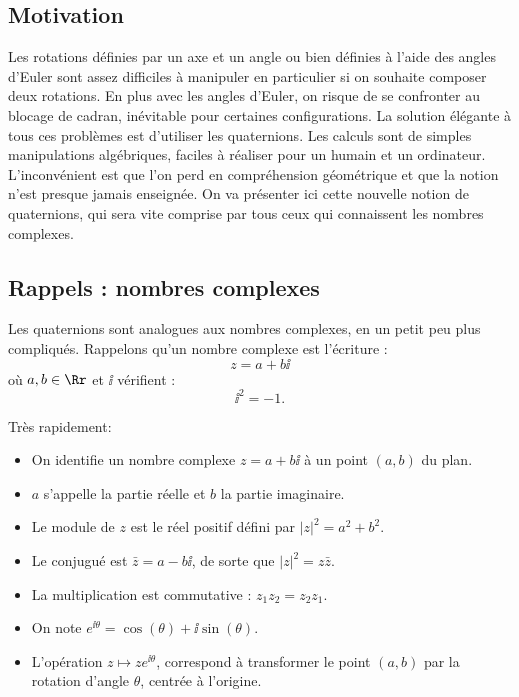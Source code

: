 \documentclass[11pt,class=report,crop=false]{standalone}
\begin{document}

\subsection{Motivation}

Les rotations définies par un axe et un angle ou bien définies à l'aide des angles d'Euler sont assez difficiles à manipuler en particulier si on souhaite composer deux rotations. En plus avec les angles d'Euler, on risque de se confronter au \og{}blocage de cadran\fg{}, inévitable pour certaines configurations.
La solution élégante à tous ces problèmes est d'utiliser les quaternions. Les calculs sont de simples manipulations algébriques, faciles à réaliser pour un humain et un ordinateur.
L'inconvénient est que l'on perd en compréhension géométrique et que la notion n'est presque jamais enseignée. On va présenter ici cette nouvelle notion de quaternions, qui sera vite comprise par tous ceux qui connaissent les nombres complexes.

\subsection{Rappels : nombres complexes}

Les quaternions sont analogues aux nombres complexes, en un petit peu plus compliqués.
Rappelons qu'un nombre complexe est l'écriture : 
$$z = a + b\ii$$
où $a,b \in \Rr$ et $\ii$ vérifient :
$$\ii^2 = -1.$$

Très rapidement:
\begin{itemize}
  \item On identifie un nombre complexe $z = a + b\ii$ à un point $(a,b)$ du plan.
  \item $a$ s'appelle la partie réelle et $b$ la partie imaginaire.
  \item Le module de $z$ est le réel positif défini par $|z|^2 = a^2 + b^2$.
  \item Le conjugué est $\bar z = a - b\ii$, de sorte que $|z|^2 = z \bar z$.
  \item La multiplication est commutative : $z_1 z_2 = z_2 z_1$.
  \item On note $e^{\ii\theta} = \cos(\theta) +  \ii\sin(\theta)$. 
  \item L'opération $z \mapsto z e^{\ii\theta}$, correspond à transformer le point $(a,b)$ par la rotation d'angle $\theta$, centrée à l'origine.
\end{itemize}
\end{document}
